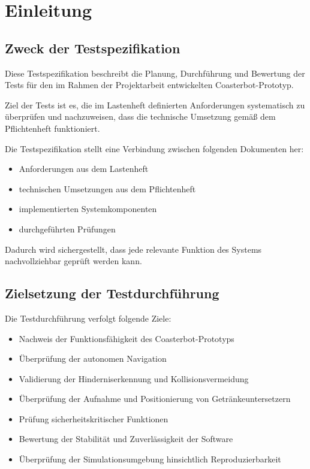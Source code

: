 \documentclass[
  a4paper,
  12pt,
  DIV=12,        %
  parskip=half,  %
  headings=small %
]{scrartcl}
\theoremstyle{definition}
\providecommand{\tightlist}{%
  \setlength{\itemsep}{0pt}\setlength{\parskip}{0pt}}
\theoremstyle{definition}
\begin{document}
\newpage

\tableofcontents

\newpage

\section{Einleitung}\label{einleitung}

\subsection{Zweck der
Testspezifikation}\label{zweck-der-testspezifikation}

Diese Testspezifikation beschreibt die Planung, Durchführung und
Bewertung der Tests für den im Rahmen der Projektarbeit entwickelten
Coasterbot-Prototyp.

Ziel der Tests ist es, die im Lastenheft definierten Anforderungen
systematisch zu überprüfen und nachzuweisen, dass die technische
Umsetzung gemäß dem Pflichtenheft funktioniert.

Die Testspezifikation stellt eine Verbindung zwischen folgenden
Dokumenten her:

\begin{itemize}
\tightlist
\item
  Anforderungen aus dem Lastenheft
\item
  technischen Umsetzungen aus dem Pflichtenheft
\item
  implementierten Systemkomponenten
\item
  durchgeführten Prüfungen
\end{itemize}

Dadurch wird sichergestellt, dass jede relevante Funktion des Systems
nachvollziehbar geprüft werden kann.

\subsection{Zielsetzung der
Testdurchführung}\label{zielsetzung-der-testdurchfuxfchrung}

Die Testdurchführung verfolgt folgende Ziele:

\begin{itemize}
\tightlist
\item
  Nachweis der Funktionsfähigkeit des Coasterbot-Prototyps
\item
  Überprüfung der autonomen Navigation
\item
  Validierung der Hinderniserkennung und Kollisionsvermeidung
\item
  Überprüfung der Aufnahme und Positionierung von Getränkeuntersetzern
\item
  Prüfung sicherheitskritischer Funktionen
\item
  Bewertung der Stabilität und Zuverlässigkeit der Software
\item
  Überprüfung der Simulationsumgebung hinsichtlich Reproduzierbarkeit
\end{itemize}
\end{document}
